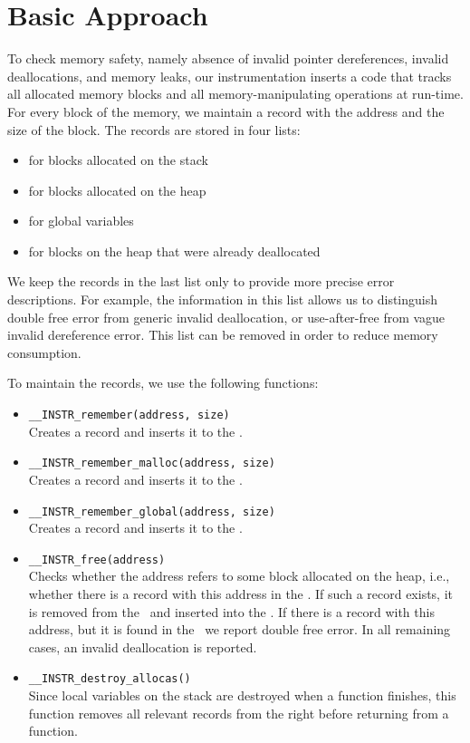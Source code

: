 \section{Basic Approach}

To check memory safety, namely absence of invalid pointer dereferences, invalid
deallocations, and memory leaks, our instrumentation inserts a code that tracks
all allocated memory blocks and all memory-manipulating operations at run-time.
For every block of the memory, we maintain a record with the address and the size
of the block. The records are stored in four lists:
\begin{itemize}
  \item \stacklist for blocks allocated on the stack
  \item \heaplist for blocks allocated on the heap
  \item \globalslist for global variables
  \item \dealloclist for blocks on the heap that were already deallocated
\end{itemize}
We keep the records in the last list only to provide more precise
error descriptions. For example, the information in this list allows
us to distinguish double free error from generic invalid deallocation,
or use-after-free from vague invalid dereference error. This list can
be removed in order to reduce memory consumption.

To maintain the records, we use the following functions:
\begin{itemize}
  \item \texttt{\_\_INSTR\_remember(address, size)}
  \\Creates a record and inserts it to the \stacklist.
  \item \texttt{\_\_INSTR\_remember\_malloc(address, size)}
  \\Creates a record and inserts it to the \heaplist.
  \item \texttt{\_\_INSTR\_remember\_global(address, size)}
  \\Creates a record and inserts it to the \globalslist.
  \item \texttt{\_\_INSTR\_free(address)}
  \\Checks whether the address refers to some block allocated on the heap,
  i.e., whether there is a record with this address in the \heaplist. If such a
  record exists, it is removed from the \heaplist\ and inserted into the
  \dealloclist. If there is a record with this address, but it is found in the
  \dealloclist\, we report double free error. In all remaining cases, an invalid
  deallocation is reported.
  \item \texttt{\_\_INSTR\_destroy\_allocas()}
  \\ Since local variables on the stack are destroyed when a function
  finishes, this function removes all relevant records from the \stacklist right
  before returning from a function.
\end{itemize}

